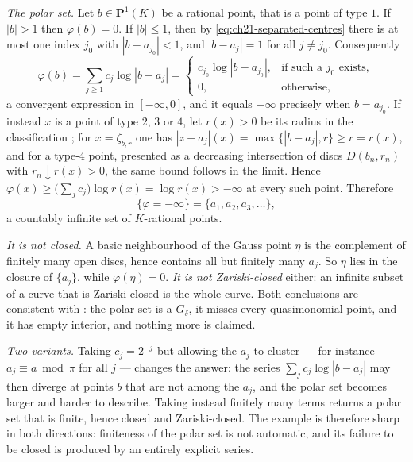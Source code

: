 \begin{example}
\emph{The polar set.}  Let \(b\in\mathbf P^1(K)\) be a rational point, that
is a point of type \(1\).  If \(|b|>1\) then \(\varphi(b)=0\).  If
\(|b|\leq1\), then by \eqref{eq:ch21-separated-centres} there is at most one
index \(j_0\) with \(|b-a_{j_0}|<1\), and \(|b-a_j|=1\) for all
\(j\neq j_0\).  Consequently
\[
 \varphi(b)=\sum_{j\geq1}c_j\log|b-a_j|
 =\begin{cases}
   c_{j_0}\log|b-a_{j_0}|, &\text{if such a }j_0\text{ exists},\\
   0, &\text{otherwise},
 \end{cases}
\]
a convergent expression in \([-\infty,0]\), and it equals \(-\infty\)
precisely when \(b=a_{j_0}\).  If instead \(x\) is a point of type \(2\),
\(3\) or \(4\), let \(r(x)>0\) be its radius in the classification
; for \(x=\zeta_{b,r}\) one has
\(|z-a_j|(x)=\max\{|b-a_j|,r\}\geq r=r(x)\), and for a type-\(4\) point,
presented as a decreasing intersection of discs \(D(b_n,r_n)\) with
\(r_n\downarrow r(x)>0\), the same bound follows in the limit.  Hence
\(\varphi(x)\geq\bigl(\sum_jc_j\bigr)\log r(x)=\log r(x)>-\infty\) at every
such point.  Therefore
\begin{equation}
\label{eq:ch21-polar-computed}
 \{\varphi=-\infty\}=\{a_1,a_2,a_3,\ldots\},
\end{equation}
a countably infinite set of \(K\)-rational points.

\emph{It is not closed.}  A basic neighbourhood of the Gauss point \(\eta\)
is the complement of finitely many open discs, hence contains all but
finitely many \(a_j\).  So \(\eta\) lies in the closure of
\(\{a_j\}\), while \(\varphi(\eta)=0\).  \emph{It is not
Zariski-closed} either: an infinite subset of a curve that is
Zariski-closed is the whole curve.  Both conclusions are consistent with
: the polar set is a \(G_\delta\), it misses
every quasimonomial point, and it has empty interior, and nothing more is
claimed.

\emph{Two variants.}  Taking \(c_j=2^{-j}\) but allowing the \(a_j\) to
cluster --- for instance \(a_j\equiv a\bmod\pi\) for all \(j\) --- changes
the answer: the series \(\sum_jc_j\log|b-a_j|\) may then diverge at points
\(b\) that are not among the \(a_j\), and the polar set becomes larger and
harder to describe.  Taking instead finitely many terms returns a polar set
that is finite, hence closed and Zariski-closed.  The example is therefore
sharp in both directions: finiteness of the polar set is not automatic, and
its failure to be closed is produced by an entirely explicit series.
\end{example}

